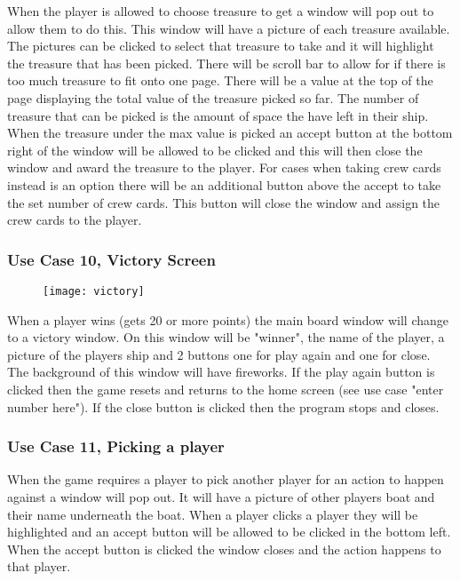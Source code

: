 \documentclass{article}
\begin{document}
When the player is allowed to choose treasure to get a window will pop out to allow them to do this. This window will have a picture of each treasure 
available. The pictures can be clicked to select that treasure to take and it will highlight the treasure that has been picked. There will be scroll bar
to allow for if there is too much treasure to fit onto one page. There will be a value at the top of the page displaying the total value of the treasure 
picked so far. The number of treasure that can be picked is the amount of space the have left in their ship. When the treasure under the max value is 
picked an accept button at the bottom right of the window will be allowed to be clicked and this will then close the window and award the treasure to the
player. For cases when taking crew cards instead is an option there will be an additional button above the accept to take the set number of crew cards. 
This button will close the window and assign the crew cards to the player.	

\subsubsection{Use Case 10, Victory Screen}

		\begin{figure}[H]
		\centering
		\texttt{[image: victory]}
		\label{fig:victory}
		\end{figure}
		
When a player wins (gets 20 or more points) the main board window will change to a victory window. On this window will be "winner", the name of the player, a 
picture of the players ship and 2 buttons one for play again and one for close. The background of this window will have fireworks. If the play again button
is clicked then the game resets and returns to the home screen (see use case "enter number here"). If the close button is clicked then the program stops and closes.


\subsubsection{Use Case 11, Picking a player}

When the game requires a player to pick another player for an action to happen against a window will pop out. It will have a picture of other players boat and their
name underneath the boat. When a player clicks a player they will be highlighted and an accept button will be allowed to be clicked in the bottom left. When the accept
button is clicked the window closes and the action happens to that player. 
\end{document}
